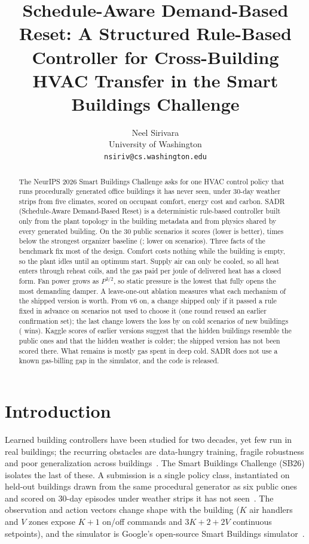 \documentclass{article}
\title{Schedule-Aware Demand-Based Reset: A Structured Rule-Based Controller for Cross-Building HVAC Transfer in the Smart Buildings Challenge}
\author{%
  Neel Sirivara\\
  University of Washington\\
  \texttt{nsiriv@cs.washington.edu}
}
\begin{document}
\maketitle

\begin{abstract}
The NeurIPS 2026 Smart Buildings Challenge asks for one HVAC control policy that runs procedurally generated office buildings it has never seen, under 30-day weather strips from five climates, scored on occupant comfort, energy cost and carbon. SADR (Schedule-Aware Demand-Based Reset) is a deterministic rule-based controller built only from the plant topology in the building metadata and from physics shared by every generated building. On the 30 public scenarios it scores \RTenConfPubCand{} (lower is better), \RElvPwTimes{} times below the strongest organizer baseline (\MetricPidWater; lower on \RElvPwWins{} scenarios). Three facts of the benchmark fix most of the design. Comfort costs nothing while the building is empty, so the plant idles until an optimum start. Supply air can only be cooled, so all heat enters through reheat coils, and the gas paid per joule of delivered heat has a closed form. Fan power grows as $P^{3/2}$, so static pressure is the lowest that fully opens the most demanding damper. A leave-one-out ablation measures what each mechanism of the shipped version is worth. From v6 on, a change shipped only if it passed a rule fixed in advance on scenarios not used to choose it (one round reused an earlier confirmation set); the last change lowers the loss by \RTenConfHarshCThreeRelAbs{} on \RTenConfHarshCThreeN{} cold scenarios of \RTenNNewBuild{} new buildings (\RTenConfHarshCThreeWins{} wins). Kaggle scores of earlier versions suggest that the hidden buildings resemble the public ones and that the hidden weather is colder; the shipped version has not been scored there. What remains is mostly gas spent in deep cold. SADR does not use a known gas-billing gap in the simulator, and the code is released.
\end{abstract}

\section{Introduction}

Learned building controllers have been studied for two decades, yet few run in real buildings; the recurring obstacles are data-hungry training, fragile robustness and poor generalization across buildings~\citep{wang2020rl}. The Smart Buildings Challenge (SB26) isolates the last of these. A submission is a single policy class, instantiated on held-out buildings drawn from the same procedural generator as six public ones and scored on 30-day episodes under weather strips it has not seen~\citep{sb26kit}. The observation and action vectors change shape with the building ($K$ air handlers and $V$ zones expose $K{+}1$ on/off commands and $3K{+}2{+}2V$ continuous setpoints), and the simulator is Google's open-source Smart Buildings simulator~\citep{goldfeder2023lightweight,goldfeder2025suite}.
\end{document}
